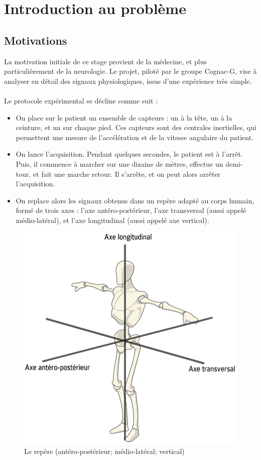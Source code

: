 \documentclass[french,12pt,notitlepage]{report}
\begin{document}
	\chapter{Introduction au problème}
	\section{Motivations}
		La motivation initiale de ce stage provient de la médecine, et plus particulièrement de la neurologie. Le projet, piloté par le groupe Cognac-G, vise à analyser en détail des signaux physiologiques, issus d'une expérience très simple.
	\\ \\
	Le protocole expérimental se décline comme suit :
	\begin{itemize}
		\item On place sur le patient un ensemble de capteurs : un à la tête, un à la ceinture, et un sur chaque pied. Ces capteurs sont des centrales inertielles, qui permettent une mesure de l'accélération et de la vitesse angulaire du patient.
		\item On lance l'acquisition. Pendant quelques secondes, le patient est à l'arrêt. Puis, il commence à marcher sur une dizaine de mètres, effectue un demi-tour, et fait une marche retour. Il s'arrête, et on peut alors arrêter l'acquisition.
		\item On replace alors les signaux obtenus dans un repère adapté au corps humain, formé de trois axes : l'axe antéro-postérieur, l'axe transversal (aussi appelé médio-latéral), et l'axe longitudinal (aussi appelé axe vertical).
	\end{itemize}

	\begin{figure}[!h]
		\includegraphics[scale=0.3]{axis.png}
		\caption{Le repère (antéro-postérieur; médio-latéral; vertical)}
		\label{axis}
	\end{figure}
\end{document}
